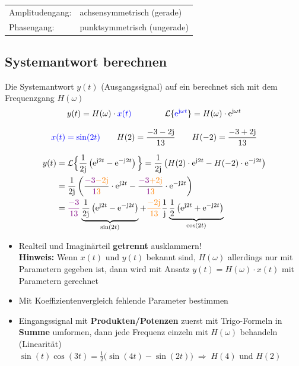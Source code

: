 \smallbreak

\begin{tabular}{ll}
    Amplitudengang: & achsensymmetrisch (gerade)    \\
    Phasengang:     & punktsymmetrisch (ungerade)
\end{tabular}

\subsection{Systemantwort berechnen}

Die Systemantwort $y(t)$ (Ausgangssignal) auf ein  berechnet sich mit dem Frequenzgang $H(\omega)$ 
$$ y(t) = H(\omega) \cdot {\color{blue}x(t)} \qquad \qquad \mathcal{L} \{ {\color{blue} \mathrm{e}^{\mathrm{j} \omega  t} } \} = H(\omega) \cdot \mathrm{e}^{\mathrm{j} \omega t} $$ 



\vspace{-0.2cm}
$${\color{blue}x(t) = \sin(2t)} \qquad H(2) = \frac{-3-2\mathrm{j}}{13} \qquad H(-2) = \frac{-3+2\mathrm{j}}{13}$$
\vspace{-0.4cm}

\begin{align*}
    y(t)    &= \mathcal{L} \Big\{ \frac{1}{2 \mathrm{j}}  \left( \mathrm{e}^{\mathrm{j} 2t} - \mathrm{e}^{- \mathrm{j} 2t} \right) \Big\} = \frac{1}{2 \mathrm{j}} \left(H(2) \cdot \mathrm{e}^{\mathrm{j} 2t} - H(-2) \cdot \mathrm{e}^{-\mathrm{j} 2t} \right) \\
            &= \frac{1}{2\mathrm{j}} \left( \frac{{\color{violet}-3}{\color{orange}-2\mathrm{j}}}{{\color{violet}1}{\color{orange}3}} \cdot \mathrm{e}^{\mathrm{j}2t} 
            - \frac{{\color{violet}-3}{\color{orange}+2\mathrm{j}}}{{\color{violet}1}{\color{orange}3}} \cdot \mathrm{e}^{-\mathrm{j}2t} \right) \\
            &= {\color{violet}\frac{-3}{13}} \underbrace{ \frac{1}{2\mathrm{j}} \left( \mathrm{e}^{\mathrm{j}2t} - \mathrm{e}^{-\mathrm{j}2t} \right)}_{\substack{\sin(2t)}} 
            + {\color{orange}\frac{-2 \mathrm{j}}{13}}  \frac{1}{\mathrm{j}} \underbrace{\frac{1}{2} \left( \mathrm{e}^{\mathrm{j}2t} + \mathrm{e}^{-\mathrm{j}2t} \right)}_{\substack{\cos(2t)}}
\end{align*}

\begin{itemize}
    \item Realteil und Imaginärteil \textbf{getrennt} ausklammern! \\
        \textbf{Hinweis:} Wenn $x(t)$ und $y(t)$ bekannt sind, $H(\omega)$ allerdings nur mit Parametern gegeben ist, dann wird mit Ansatz
        $y(t) = H(\omega) \cdot x(t)$ mit Parametern gerechnet
    \item Mit Koeffizientenvergleich fehlende Parameter bestimmen
    \item Eingangssignal mit \textbf{\color{red}Produkten/Potenzen}
    zuerst mit Trigo-Formeln in \textbf{Summe} umformen,
    dann jede Frequenz einzeln mit $H(\omega)$ behandeln (Linearität) \\
    $\sin(t)\cos(3t) = \frac{1}{2}\big(\sin(4t) - \sin(2t)\big)
    \;\Rightarrow\; H(4)$ und $H(2)$
\end{itemize}


